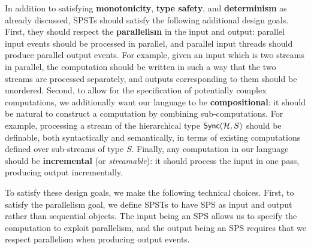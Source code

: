 In addition to satisfying \textbf{monotonicity}, \textbf{type safety}, and \textbf{determinism} as already discussed,
SPSTs should satisfy the following additional design goals.
First, they should respect the \textbf{parallelism}
in the input and output: parallel input events should be processed in parallel,
and parallel input threads should produce parallel output events.
For example, given an input which is two streams in parallel, the computation should be written in such a way that the two streams are processed separately, and outputs corresponding to them should be unordered.
Second,
to allow for the specification of potentially complex computations, we additionally want our language to be \textbf{compositional}: it should be natural to construct a computation by combining sub-computations.
For example, processing a stream of the hierarchical type $\mathsf{Sync}({\mathcal{H}}, S)$
should be definable, both syntactically and semantically, in terms of
existing computations defined over sub-streams of type $S$.
Finally, any computation in our language should be \textbf{incremental} (or \emph{streamable}): it should process the input in one pass, producing output incrementally.

To satisfy these design goals, we make the following technical choices.
First, to satisfy the parallelism goal, we define SPSTs to have SPS as input and output rather than sequential objects.
The input being an SPS allows us to specify the computation to exploit parallelism,
and the output being an SPS requires that we respect parallelism when producing output events.

